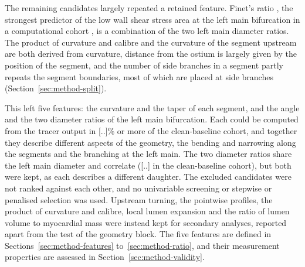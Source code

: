 The remaining candidates largely repeated a retained feature.
Finet's ratio \cite{finet2008fractal}, the strongest predictor of the low wall shear stress area at the left main bifurcation in a computational cohort \cite{gharleghi2024leftmain}, is a combination of the two left main diameter ratios.
The product of curvature and calibre and the curvature of the segment upstream are both derived from curvature, distance from the ostium is largely given by the position of the segment, and the number of side branches in a segment partly repeats the segment boundaries, most of which are placed at side branches (Section~\ref{sec:method-split}).

This left five features: the curvature and the taper of each segment, and the angle and the two diameter ratios of the left main bifurcation.
Each could be computed from the tracer output in [..]\% or more of the clean-baseline cohort, and together they describe different aspects of the geometry, the bending and narrowing along the segments and the branching at the left main.
The two diameter ratios share the left main diameter and correlate ([..] in the clean-baseline cohort), but both were kept, as each describes a different daughter.
The excluded candidates were not ranked against each other, and no univariable screening or stepwise or penalised selection was used.
Upstream turning, the pointwise profiles, the product of curvature and calibre, local lumen expansion and the ratio of lumen volume to myocardial mass were instead kept for secondary analyses, reported apart from the test of the geometry block.
The five features are defined in Sections~\ref{sec:method-features} to~\ref{sec:method-ratio}, and their measurement properties are assessed in Section~\ref{sec:method-validity}.
